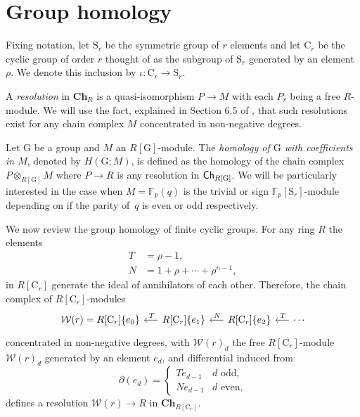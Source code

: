
\section{Group homology} \label{s:goup homology}

Fixing notation, let $\mathrm{S}_r$ be the symmetric group of $r$ elements and let $\mathrm{C}_r$ be the cyclic group of order $r$ thought of as the subgroup of $\mathrm{S}_r$ generated by an element~$\rho$.
We denote this inclusion by $\iota \colon \mathrm C_r \to \mathrm S_r$.

A \textit{resolution} in $\mathbf{Ch}_R$ is a quasi-isomorphism $P \to M$ with each $P_r$ being a free $R$-module.
We will use the fact, explained in Section 6.5 of \cite{jacobson1989algebra}, that such resolutions exist for any chain complex $M$ concentrated in non-negative degrees.

Let $\mathrm G$ be a group and $M$ an $R[\mathrm G]$-module.
The \textit{homology of $\mathrm G$ with coefficients in $M$}, denoted by $H(\mathrm G; M)$, is defined as the homology of the chain complex $P \otimes_{R[\mathrm G]} M$ where $P \to R$ is any resolution in $\mathsf{Ch}_{R[\mathrm G]}$.
We will be particularly interested in the case when $M = \mathbb F_p(q)$ is the trivial or sign $\mathbb F_p[\mathrm{S}_r]$-module depending on if the parity of~$q$ is even or odd respectively.

We now review the group homology of finite cyclic groups.
For any ring $R$ the elements
\begin{equation} \label{eq: T and R definition}
\begin{split}
T &= \rho - 1, \\
N &= 1 + \rho + \cdots + \rho^{n-1},
\end{split}
\end{equation}
in $R[\mathrm{C}_r]$ generate the ideal of annihilators of each other.
Therefore, the chain complex of $R[\mathrm{C}_r]$-modules
\begin{equation} \label{eq: minimal resolution}
\begin{tikzcd} [column sep = .5cm]
\mathcal W(r) = R[\mathrm{C}_r]\{e_0\} & \arrow[l, "\,T"'] R[\mathrm{C}_r]\{e_1\} & \arrow[l, "\,N"'] R[\mathrm{C}_r]\{e_2\} & \arrow[l, "\,T"'] \cdots
\end{tikzcd}
\end{equation}
concentrated in non-negative degrees, with $\mathcal W(r)_d$ the free $R[\mathrm{C}_r]$-module $\mathcal W(r)_d$ generated by an element $e_d$, and differential induced from
\begin{equation*}
\partial(e_d) = \begin{cases}
Te_{d-1} & d \text{ odd,} \\
Ne_{d-1} & d \text{ even,}
\end{cases}
\end{equation*}
defines a resolution $\mathcal W(r) \to R$ in $\mathbf{Ch}_{R[\mathrm{C}_r]}$.

